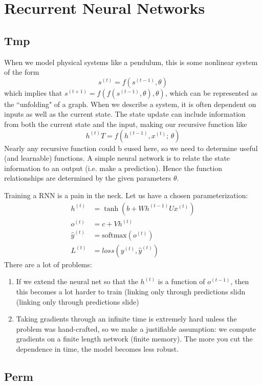 \documentclass{article}
\theoremstyle{definition}
\theoremstyle{remark}
\theoremstyle{definition}
\begin{document}
\section{Recurrent Neural Networks}

\subsection{Tmp} 

When we model physical systems like a pendulum, this is some nonlinear system of the form
\[s^{(t)} = f(s^{(t - 1)}, \theta)\]
which implies that $s^{(t+1)} = f(f(s^{(t-1)}, \theta), \theta)$, which can be represented as the ``unfolding" of a graph. When we describe a system, it is often dependent on inputs as well as the current state. The state update can include information from both the current state and the input, making our recursive function like 
\[h^{(t)} T= f(h^{(t-1)}, x^{(t)}; \, \theta)\] 
Nearly any recursive function could b eused here, so we need to determine useful (and learnable) functions. A simple neural network is to relate the state information to an output (i.e. make a prediction). Hence the function relationships are determined by the given parameters $\theta$.

Training a RNN is a pain in the neck. Let us have a chosen parameterization: 
\begin{align*} 
    h^{(t)} & = \tanh(b + W h^{(t-1)} U x^{(t)}) \\
    o^{(t)} & = c + V h^{(t)} \\ 
    \hat{y}^{(t)} & = \mathrm{softmax}(o^{(t)}) \\
    L^{(t)} & = loss(y^{(t)}, \hat{y}^{(t)})
\end{align*} 
There are a lot of problems: 
\begin{enumerate}
    \item If we extend the neural net so that the $h^{(t)}$ is a function of $o^{(t-1)}$, then this becomes a lot harder to train (linking only through predictions slidn (linking only through predictions slide) 
    \item Taking gradients through an infinite time is extremely hard unless the problem was hand-crafted, so we make a justifiable assumption: we compute gradients on a finite length network (finite memory). The more you cut the dependence in time, the model becomes less robust.  
\end{enumerate}


\subsection{Perm}
\end{document}
